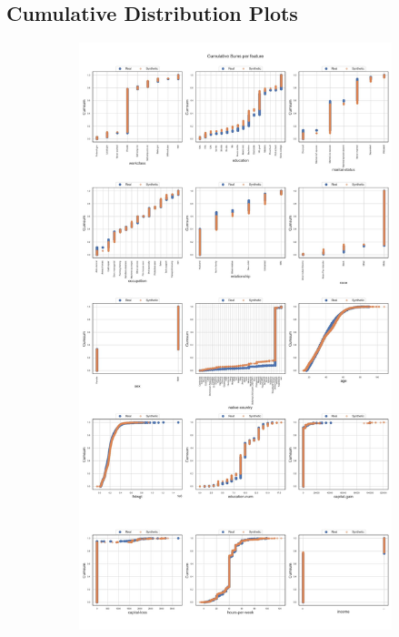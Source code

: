 

\subsection[]{Cumulative Distribution Plots}
\label{A:cumsum}
\newpage
\begin{landscape}
	\begin{figure}[h]
		\centering
		\hfill
		\begin{subfigure}{0.3\linewidth}
			\includegraphics[height=\textheight,width=\linewidth,keepaspectratio]{images/cumsums/ctabgan.jpg}

\end{subfigure}
\end{figure}
\end{landscape}
